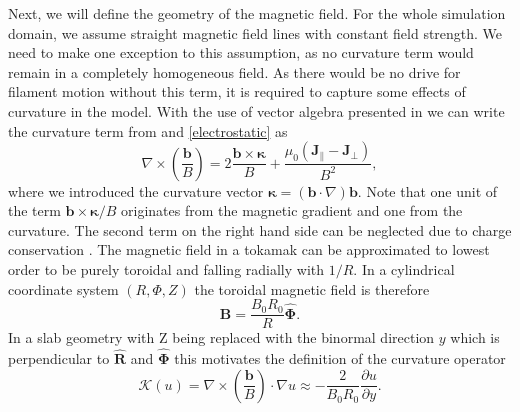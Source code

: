 Next, we will define the geometry of the magnetic field. For the whole simulation domain, we assume {straight magnetic field} lines with {constant} field strength. We need to make one exception to this assumption, as no curvature term would remain in a completely homogeneous field. As there would be no drive for filament motion without this term, it is required to capture some effects of curvature in the model. With the use of vector algebra presented in \cite{militellobook} we can write the curvature term from  and \eqref{electrostatic} as
\begin{equation}
	\nabla\times\left(\frac{\textbf{b}}{B}\right) = 2\frac{\textbf{b}\times{\boldsymbol\kappa}}{B} + \frac{\mu_0\left(\textbf{J}_\parallel - \textbf{J}_\perp\right)}{B^2},
\end{equation}
where we introduced the curvature vector $\boldsymbol\kappa = (\textbf{b}\cdot\nabla)\textbf{b}$. Note that one unit of the term $\textbf{b}\times\boldsymbol\kappa/B$ originates from the magnetic gradient and one from the curvature. The second term on the right hand side can be neglected due to charge conservation \cite{militellobook}. The magnetic field in a tokamak can be approximated to lowest order to be purely toroidal and falling radially with $1/R$. In a cylindrical coordinate system $(R,\Phi,Z)$ the toroidal magnetic field is therefore
\begin{equation}
	\textbf{B} = \frac{B_0R_0}{R}\boldsymbol{\widehat{\Phi}}.
\end{equation}
In a slab geometry with Z being replaced with the binormal direction $y$ which is perpendicular to $\widehat{\textbf{R}}$ and $\boldsymbol{\widehat{\Phi}}$ this motivates the definition of the curvature operator
\begin{equation}\label{curvature}
	\mathcal{K}(u) = \nabla\times \left(\frac{\textbf{b}}{B}\right)\cdot\nabla u\approx -\frac{2}{B_0R_0}\frac{\partial u}{\partial y}.
\end{equation}

